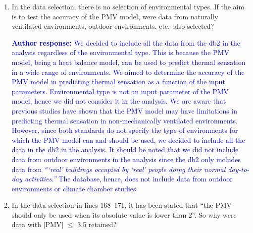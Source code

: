 \documentclass[a4paper, 10pt]{letter}
\newcommand{\response}[1]{\textcolor{blue}{\textbf{Author response:} #1}}
\begin{document}
\begin{letter}
\begin{enumerate}
            \item In the data selection, there is no selection of environmental types.
            If the aim is to test the accuracy of the PMV model, were data from naturally ventilated environments, outdoor environments, etc.\ also selected?

            \response{
                We decided to include all the data from the \ac{db2} in the analysis regardless of the environmental type.
                This is because the PMV model, being a heat balance model, can be used to predict thermal sensation in a wide range of environments.
                We aimed to determine the accuracy of the PMV model in predicting thermal sensation as a function of the input parameters.
                Environmental type is not an input parameter of the PMV model, hence we did not consider it in the analysis.
                We are aware that previous studies have shown that the PMV model may have limitations in predicting thermal sensation in non-mechanically ventilated environments.
                However, since both standards do not specify the type of environments for which the PMV model can and should be used, we decided to include all the data in the \ac{db2} in the analysis.
                It should be noted that we did not include data from outdoor environments in the analysis since the \ac{db2} only includes data from \textit{```real' buildings occupied by `real' people doing their normal day-to-day activities.''}
                The database, hence, does not include data from outdoor environments or climate chamber studies.
            }

            \item In the data selection in lines 168--171, it has been stated that ``the PMV should only be used when its absolute value is lower than 2''.
            So why were data with $|$PMV$|$ $\leq$ 3.5 retained?


\end{enumerate}
\end{letter}
\end{document}
